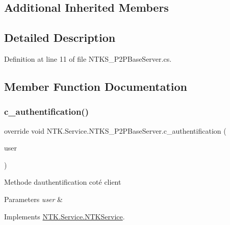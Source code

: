 \subsection*{Additional Inherited Members}


\subsection{Detailed Description}


Definition at line 11 of file N\+T\+K\+S\+\_\+\+P2\+P\+Base\+Server.\+cs.



\subsection{Member Function Documentation}
\mbox{\label{class_n_t_k_1_1_service_1_1_n_t_k_s___p2_p_base_server_a7a8a841137b8fcce5cf7c1f122d732f5}} 
\subsubsection{\texorpdfstring{c\_authentification()}{c\_authentification()}}
{\footnotesize\ttfamily override void N\+T\+K.\+Service.\+N\+T\+K\+S\+\_\+\+P2\+P\+Base\+Server.\+c\+\_\+authentification (\begin{DoxyParamCaption}\item[{\mbox{\hyperlink{class_n_t_k_1_1_n_t_k_user}{N\+T\+K\+User}}}]{user }\end{DoxyParamCaption})\hspace{0.3cm}{\ttfamily [virtual]}}



Methode d\textquotesingle{}authentification coté client 


\begin{DoxyParams}{Parameters}
{\em user} & \\
\hline
\end{DoxyParams}


Implements \mbox{\hyperlink{class_n_t_k_1_1_service_1_1_n_t_k_service_a8c2fd33b41da5a4edf9911682dfd36cd}{N\+T\+K.\+Service.\+N\+T\+K\+Service}}.



